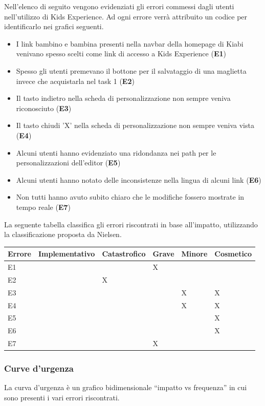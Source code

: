 \documentclass[12pt,italian,]{report}
\begin{document}
Nell'elenco di seguito vengono evidenziati gli errori commessi dagli
utenti nell'utilizzo di Kids Experience. Ad ogni errore verrà attribuito
un codice per identificarlo nei grafici seguenti.

\begin{itemize}
\item I link bambino e bambina presenti nella navbar della homepage di Kiabi venivano spesso scelti come link di accesso a Kids Experience (\textbf{E1})
\item Spesso gli utenti premevano il bottone per il salvataggio di una maglietta invece che acquistarla nel task 1 (\textbf{E2})
\item Il tasto indietro nella scheda di personalizzazione non sempre veniva riconosciuto (\textbf{E3})
\item Il tasto chiudi 'X' nella scheda di personalizzazione non sempre veniva vista (\textbf{E4})
\item Alcuni utenti hanno evidenziato una ridondanza nei path per le personalizzazioni dell'editor (\textbf{E5})
\item Alcuni utenti hanno notato delle inconsistenze nella lingua di alcuni link (\textbf{E6})
\item Non tutti hanno avuto subito chiaro che le modifiche fossero mostrate in tempo reale (\textbf{E7})
\end{itemize}

La seguente tabella classifica gli errori riscontrati in base
all'impatto, utilizzando la classificazione proposta da Nielsen.

\begin{longtable}[]{@{}llllll@{}}
\toprule
Errore & Implementativo & Catastrofico & Grave & Minore &
Cosmetico\tabularnewline
\midrule
\endhead
E1 & & & X & &\tabularnewline
E2 & & X & & &\tabularnewline
E3 & & & & X & X\tabularnewline
E4 & & & & X & X\tabularnewline
E5 & & & & & X\tabularnewline
E6 & & & & & X\tabularnewline
E7 & & & X & &\tabularnewline
\bottomrule
\end{longtable}

\hypertarget{curve-durgenza}{%
\subsubsection{Curve d'urgenza}\label{curve-durgenza}}

La curva d'urgenza è un grafico bidimensionale ``impatto vs frequenza''
in cui sono presenti i vari errori riscontrati.
\end{document}
